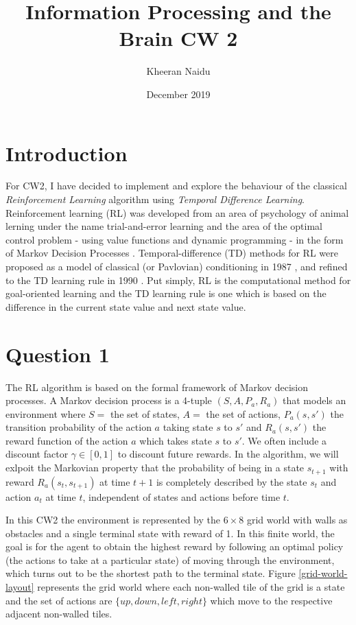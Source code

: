 \documentclass[10pt, a4paper]{article}
\title{Information Processing and the Brain CW 2}
\author{Kheeran Naidu}
\date{December 2019}
\begin{document}
\maketitle

\section*{Introduction}
For CW2, I have decided to implement and explore the behaviour of the classical \textit{Reinforcement Learning} algorithm using \textit{Temporal Difference Learning}. Reinforcement learning (RL) was developed from an area of psychology of animal lerning under the name trial-and-error learning \cite{woodworth1937experimental} and the area of the optimal control problem - using value functions and dynamic programming - in the form of Markov Decision Processes \cite{bellman1957markov}\cite{bellman1957dynamic}. Temporal-difference (TD) methods for RL were proposed as a model of classical (or Pavlovian) conditioning in 1987 \cite{sutton1987temporal}, and refined to the TD learning rule in 1990 \cite{sutton1990time}. Put simply, RL is the computational method for goal-oriented learning and the TD learning rule is one which is based on the difference in the current state value and next state value.

\section*{Question 1}
The RL algorithm is based on the formal framework of Markov decision processes. A Markov decision process is a 4-tuple $(S,A,P_a, R_a)$ that models an environment where $S =$ the set of states, $A =$ the set of actions, $P_a(s,s')$ the transition probability of the action $a$ taking state $s$ to $s'$ and $R_a(s,s')$ the reward function of the action $a$ which takes state $s$ to $s'$. We often include a discount factor $\gamma \in [0,1]$ to discount future rewards. In the algorithm, we will exlpoit the Markovian property that the probability of being in a state $s_{t+1}$ with reward $R_a(s_t, s_{t+1})$ at time $t+1$ is completely described by the state $s_t$ and action $a_t$ at time $t$, independent of states and actions before time $t$.

In this CW2 the environment is represented by the $6 \times 8$ grid world with walls as obstacles and a single terminal state with reward of 1. In this finite world, the goal is for the agent to obtain the highest reward by following an optimal policy (the actions to take at a particular state) of moving through the environment, which turns out to be the shortest path to the terminal state. Figure \ref{grid-world-layout} represents the grid world where each non-walled tile of the grid is a state and the set of actions are $\{up, down, left, right\}$ which move to the respective adjacent non-walled tiles.
\end{document}

